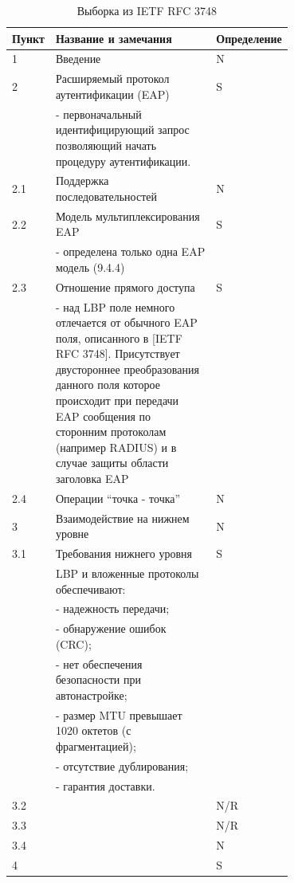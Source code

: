 \begin{longtable}{|l|p{0.7\linewidth}|l|}
  \caption{Выборка из IETF RFC 3748} \\ %
   \hline 
   Пункт & Название и замечания & Определение \\
   \hline
   1 & Введение  & N \\
   \hline
   2 & Расширяемый протокол аутентификации (EAP) & S \\ & - первоначальный идентифицирующий запрос позволяющий начать процедуру аутентификации.& \\
   \hline 
   2.1 & Поддержка последовательностей & N \\
   \hline
   2.2 & Модель мультиплексирования EAP & S \\ & - определена только одна EAP модель (9.4.4) &  \\
   \hline
   2.3 & Отношение прямого доступа & S \\ & - над LBP поле немного отлечается от обычного EAP поля, описанного в [IETF RFC 3748]. Присутствует двустороннее преобразования данного поля которое происходит при передачи EAP сообщения по сторонним протоколам (например RADIUS) и в случае защиты области заголовка EAP &  \\
   \hline
   2.4 & Операции ``точка - точка'' & N \\
   \hline
   3 & Взаимодействие на нижнем уровне & N \\
   \hline 
   3.1 & Требования нижнего уровня & S \\ & LBP и вложенные протоколы обеспечивают: & \\
    & - надежность передачи; & \\
    & - обнаружение ошибок (CRC); & \\
    & - нет обеспечения безопасности при автонастройке; & \\
    & - размер MTU превышает 1020 октетов (с фрагментацией); & \\
    & - отсутствие дублирования; & \\ 
    & - гарантия доставки. & \\
   \hline
   3.2 & & N/R \\
   \hline
   3.3 & & N/R \\
   \hline
   3.4 & & N \\
   \hline
   4 & & S \\

\end{longtable}
